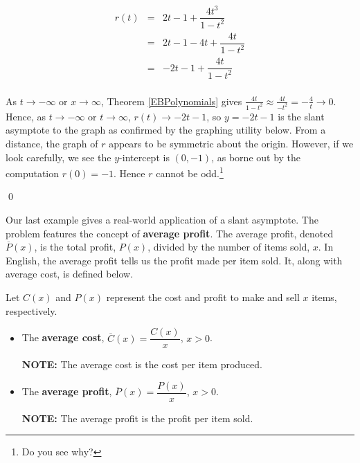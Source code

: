 \documentclass{ximera}
\begin{document}
\begin{example}
\begin{enumerate}
\[\begin{array}{rcl}
 r(t) & = & 2t-1+\dfrac{4t^3}{1-t^2} \\
       &= &  2t-1-4t+\dfrac{4t}{1-t^2} \\
       & = & -2t-1 + \dfrac{4t}{1-t^2} \\ \end{array}\]
       
As $t \rightarrow -\infty$ or $x \rightarrow \infty$,  Theorem \ref{EBPolynomials} gives  $\frac{4t}{1-t^2} \approx \frac{4t}{-t^2} = -\frac{4}{t} \rightarrow 0$.  Hence, as $t \rightarrow -\infty$ or $t \rightarrow \infty$, $r(t) \rightarrow -2t-1$, so $y = -2t-1$ is the slant asymptote to the graph as confirmed by the graphing utility below.  From a distance, the graph of $r$ appears to be symmetric about the origin.  However, if we look carefully, we see the $y$-intercept is $(0,-1)$, as borne out by the computation $r(0) = -1$.  Hence $r$ cannot be odd.\footnote{Do you see why?}

\begin{center}
\end{center} 

\qed

\end{enumerate}

\end{example}

Our last example gives a real-world application of a slant asymptote. The problem features the concept of \textbf{average profit}. The average profit, denoted $\overline{P}(x)$,  is the total profit, $P(x)$,  divided by the number of items sold, $x$. In English, the average profit tells us the profit made per item sold. It, along with average cost, is defined below.


\begin{definition} \label{averagecostprofit} Let $C(x)$ and $P(x)$ represent the cost and profit to make and sell $x$ items, respectively.

\begin{itemize}

\item    The  \textbf{average cost}, $\overline{C}(x) = \dfrac{C(x)}{x}$, $x > 0$.  

\textbf{NOTE:}  The average cost is the cost per item produced.

\item   The  \textbf{average profit}, $\overline{P}(x) = \dfrac{P(x)}{x}$, $x > 0$.  

\textbf{NOTE:}  The average profit is the profit  per item sold.

\end{itemize}

\end{definition}
\end{document}

